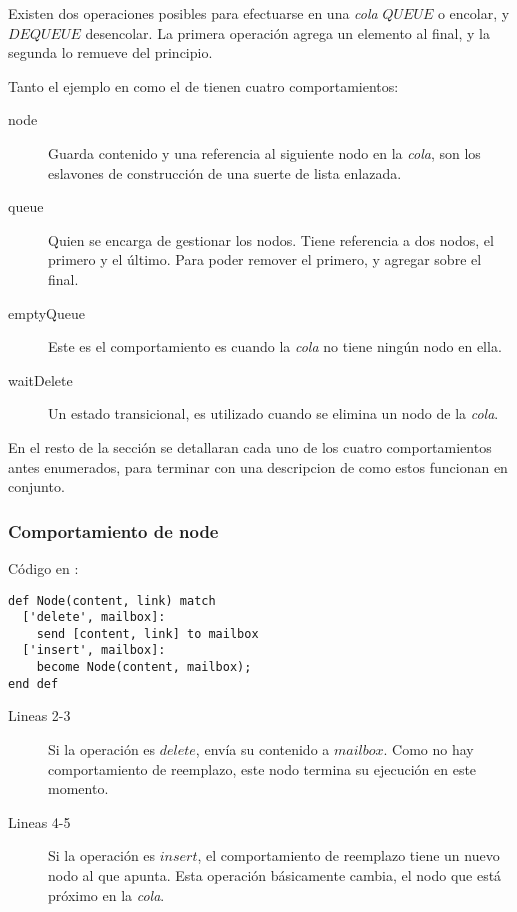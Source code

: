 Existen dos operaciones posibles para efectuarse en una \textit{cola} $QUEUE$ o encolar, y $DEQUEUE$ desencolar. La primera operación agrega un elemento al final, y la segunda lo remueve del principio. 

Tanto el ejemplo en \SAL como el de \CSPm tienen cuatro comportamientos:

\begin{description}
 \item [node] Guarda contenido y una referencia al siguiente nodo en la \textit{cola}, son los eslavones de construcción de una suerte de lista enlazada.
 \item [queue] Quien se encarga de gestionar los nodos. Tiene referencia a dos nodos, el primero y el último. Para poder remover el primero, y agregar sobre el final.
 \item [emptyQueue] Este es el comportamiento es cuando la \textit{cola} no tiene ningún nodo en ella.
 \item [waitDelete] Un estado transicional, es utilizado cuando se elimina un nodo de la \textit{cola}.
\end{description}

En el resto de la sección se detallaran cada uno de los cuatro comportamientos antes enumerados, para terminar con una descripcion de como estos funcionan en conjunto.

\subsubsection*{Comportamiento de node}

Código en \SAL:

\begin{lstlisting}[language=sal, style=simple]
def Node(content, link) match
  ['delete', mailbox]:
    send [content, link] to mailbox
  ['insert', mailbox]:
    become Node(content, mailbox);
end def
\end{lstlisting}

\begin{description}
 \item [Lineas 2-3] Si la operación es $delete$, envía su contenido a $mailbox$. Como no hay comportamiento de reemplazo, este nodo termina su ejecución en este momento.
 \item [Lineas 4-5] Si la operación es $insert$, el comportamiento de reemplazo tiene un nuevo nodo al que apunta. Esta operación básicamente cambia, el nodo que está próximo en la \textit{cola}.
\end{description}

